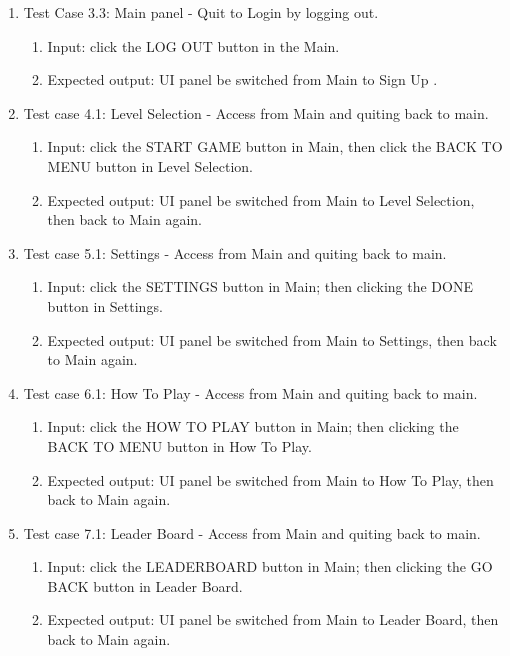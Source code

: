 \documentclass[11pt]{article}
\begin{document}
\begin{enumerate}
\begin{enumerate}
        \end{enumerate}
        \item Test Case 3.3: Main panel - Quit to Login by logging out.
        \begin{enumerate}
            \item  Input: click the LOG OUT button in the Main.
            \item  Expected output: UI panel be switched from Main to Sign Up .
        \end{enumerate}
        \item Test case 4.1: Level Selection - Access from Main and quiting back to main.
        \begin{enumerate}
            \item  Input: click the START GAME button in Main, then click the BACK TO MENU button in Level Selection.
            \item  Expected output: UI panel be switched from Main to Level Selection, then back to Main again.
        \end{enumerate}
        \item Test case 5.1: Settings - Access from Main and quiting back to main.
        \begin{enumerate}
            \item  Input: click the SETTINGS button in Main; then clicking the DONE button in Settings.
            \item  Expected output: UI panel be switched from Main to Settings, then back to Main again.
        \end{enumerate}
        \item Test case 6.1: How To Play - Access from Main and quiting back to main.
        \begin{enumerate}
            \item  Input: click the HOW TO PLAY button in Main; then clicking the BACK TO MENU button in How To Play.
            \item  Expected output: UI panel be switched from Main to How To Play, then back to Main again.
        \end{enumerate}
        \item Test case 7.1: Leader Board - Access from Main and quiting back to main.
        \begin{enumerate}
            \item  Input: click the LEADERBOARD button in Main; then clicking the GO BACK button in Leader Board.
            \item  Expected output: UI panel be switched from Main to Leader Board, then back to Main again.

\end{enumerate}
\end{enumerate}
\end{document}
